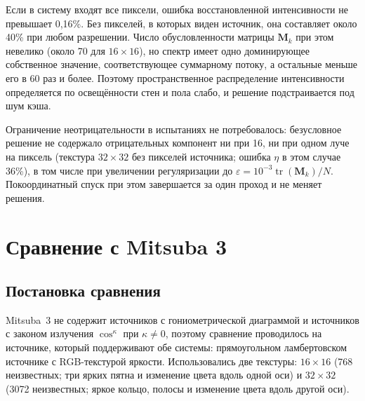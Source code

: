 Если в систему входят все пиксели, ошибка восстановленной интенсивности не превышает 0,16\%. Без пикселей, в которых виден источник, она составляет около 40\% при любом разрешении. Число обусловленности матрицы $\mathbf{M}_k$ при этом невелико (около 70 для $16\times16$), но спектр имеет одно доминирующее собственное значение, соответствующее суммарному потоку, а остальные меньше его в 60 раз и более. Поэтому пространственное распределение интенсивности определяется по освещённости стен и пола слабо, и решение подстраивается под шум кэша.

Ограничение неотрицательности в испытаниях не потребовалось: безусловное решение не содержало отрицательных компонент ни при 16, ни при одном луче на пиксель (текстура $32\times32$ без пикселей источника; ошибка $\eta$ в этом случае 36\%), в том числе при увеличении регуляризации до $\varepsilon=10^{-3}\operatorname{tr}(\mathbf{M}_k)/N$. Покоординатный спуск при этом завершается за один проход и не меняет решения.

\section{Сравнение с Mitsuba 3}
\label{sec:mitsuba}

\subsection{Постановка сравнения}

Mitsuba~3 не содержит источников с гониометрической диаграммой и источников с законом излучения $\cos^\kappa$ при $\kappa\neq0$, поэтому сравнение проводилось на источнике, который поддерживают обе системы: прямоугольном ламбертовском источнике с RGB-текстурой яркости. Использовались две текстуры: $16\times16$ (768 неизвестных; три ярких пятна и изменение цвета вдоль одной оси) и $32\times32$ (3072 неизвестных; яркое кольцо, полосы и изменение цвета вдоль другой оси).

